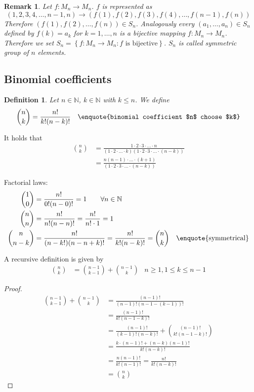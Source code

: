\documentclass[a4paper,landscape,twocolumn]{article}
\newtheorem{defi}{Definition}
\newtheorem{rem}{Remark}
\newcommand\set[1]{\left\{#1\right\}}
\begin{document}
\begin{rem}
  Let $f: M_n \rightarrow M_n$. $f$ is represented as
  \[  (1, 2, 3, 4, \ldots, n-1, n) \rightarrow (f(1), f(2), f(3), f(4), \ldots, f(n-1), f(n))  \]
  Therefore $(f(1), f(2), \ldots, f(n)) \in S_n$. Analogously every $(a_1, \ldots, a_n) \in S_n$
  defined by $f(k) = a_k$ for $k=1,\ldots,n$ is a bijective mapping $f: M_n \rightarrow M_n$.
  Therefore we set $S_n = \set{f: M_n \rightarrow M_n: f \text{ is bijective}}$.
  $S_n$ is called symmetric group of $n$ elements.
\end{rem}

\subsection{Binomial coefficients}
\begin{defi}
  Let $n \in \mathbb{N}$, $k \in \mathbb{N}$ with $k \leq n$.
  We define \begin{align*}
    \binom{n}{k} &= \frac{n!}{k! (n-k)!}   & \text{\enquote{binomial coefficient $n$ choose $k$}}
  \end{align*}
\end{defi}

It holds that
\begin{align*}
  \binom{n}{k} &= \frac{1\cdot 2\cdot 3\cdot \ldots \cdot n}{(1 \cdot 2 \cdot \ldots \cdot k) (1 \cdot 2 \cdot 3 \cdot \ldots \cdot (n-k))} \\
               &= \frac{n (n-1) \cdot \ldots \cdot (k+1)}{(1 \cdot 2 \cdot 3 \cdot \ldots \cdot (n-k))}
\end{align*}

Factorial laws:
\begin{align*}
  \binom 10 &= \frac{n!}{0! (n-0)!} = 1 \qquad \forall n \in \mathbb{N} \\
  \binom nn &= \frac{n!}{n! (n - n)!} = \frac{n!}{n! \cdot 1} = 1 \\
  \binom{n}{n-k} &= \frac{n!}{(n-k!)(n - n + k)!} = \frac{n!}{k! (n-k)!} = \binom nk & \text{\enquote{symmetrical}}
\end{align*}

A recursive definition is given by
\begin{align*}
    \binom nk &= \binom{n-1}{k-1} + \binom{n-1}{k}
    & n \geq 1, 1 \leq k \leq n-1
\end{align*}

\begin{proof}
  \begin{align*}
      \binom{n-1}{k-1} + \binom{n-1}{k}
          &= \frac{(n-1)!}{(n-1)! (n-1 - (k-1))!} \\
          &= \frac{(n-1)!}{k! (n-1-k)!} \\
      &= \frac{(n-1)!}{(k-1)! (n-k)!} + \binom{(n-1)!}{k! (n-1-k)!} \\
      &= \frac{k \cdot (n-1)! + (n-k)(n-1)!}{k! (n-k)!} \\
      &= \frac{n (n-1)!}{k!(n-1)!} = \frac{n!}{k! (n-k)!} \\
      &= \binom nk
  \end{align*}
\end{proof}
\end{document}
